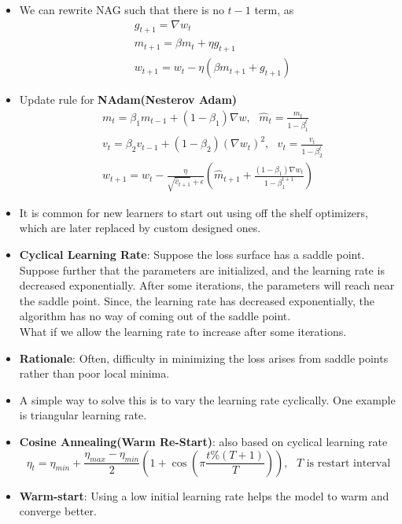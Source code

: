 \documentclass[a4paper]{article}
\begin{document}
\begin{itemize}
    \item We can rewrite NAG such that there is no $t-1$ term, as
    \begin{equation*}
        \begin{split}
            &g_{t+1} = \nabla w_t\\
            &m_{t+1} = \beta m_t + \eta g_{t+1}\\
            &w_{t+1} = w_t - \eta(\beta m_{t+1} + g_{t+1})
        \end{split}
    \end{equation*}
    \item Update rule for \textbf{NAdam(Nesterov Adam)}
    \begin{equation*}
        \begin{split}
            &m_t = \beta_1m_{t-1}+(1-\beta_1)\nabla w, \text{   }\hat{m}_t = \frac{m_t}{1-\beta_1^t}\\
            &v_t = \beta_2v_{t-1}+(1-\beta_2)(\nabla w_t)^2, \text{   }\hat{v}_t = \frac{v_t}{1-\beta_2^t}\\
            &w_{t+1} = w_t - \frac{\eta}{\sqrt{\hat{v}_{t+1}}+\epsilon}(\hat{m}_{t+1}+\frac{(1-\beta_1)\nabla w_t}{1 - \beta_1^{t+1}})
        \end{split}
    \end{equation*}
    \item It is common for new learners to start out using off the shelf optimizers, which are later replaced by custom designed ones.
    \item \textbf{Cyclical Learning Rate}: Suppose the loss surface has a saddle point. Suppose further that the parameters are initialized, and the learning rate is decreased exponentially. After some iterations, the parameters will reach near the saddle point. Since, the learning rate has decreased exponentially, the algorithm has no way of coming out of the saddle point.\\
    What if we allow the learning rate to increase after some iterations.
    \item \textbf{Rationale}: Often, difficulty in minimizing the loss arises from saddle points rather than poor local minima.
    \item A simple way to solve this is to vary the learning rate cyclically. One example is triangular learning rate.
    \item \textbf{Cosine Annealing(Warm Re-Start)}: also based on cyclical learning rate
    \begin{equation*}
        \eta_t = \eta_{min} + \frac{\eta_{max}-\eta_{min}}{2}(1+\cos(\pi \frac{t\%(T+1)}{T})), \text{ }T\text{ is restart interval}
    \end{equation*}
    \item \textbf{Warm-start}: Using a low initial learning rate helps the model to warm and converge better.
\end{itemize}
\end{document}
